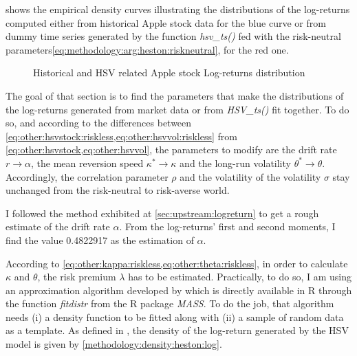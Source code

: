 \documentclass[12pt]{report}
\begin{document}
 shows the empirical density curves illustrating the distributions of the log-returns computed either from historical Apple stock data for the blue curve or from dummy time series generated by the function \textit{hsv\_ts()} fed with the risk-neutral parameters\ref{eq:methodology:arg:heston:riskneutral}, for the red one.


\begin{figure}[ht]
  \centering
  
  \caption{Historical and HSV related Apple stock Log-returns distribution}
  \label{p:methodology:density:aapl:heston:riskneutral}
\end{figure}


The goal of that section is to find the parameters that make the distributions of the log-returns generated from market data or from \textit{HSV\_ts()} fit together.
To do so, and according to the differences between \cref{eq:other:hsvstock:riskless,eq:other:hsvvol:riskless} from \cref{eq:other:hsvstock,eq:other:hsvvol}, the parameters to modify are the drift rate $r \to \alpha$, the mean reversion speed $\kappa^{*} \to \kappa$ and the long-run volatility $\theta^* \to \theta$.
Accordingly, the correlation parameter $\rho$ and the volatility of the volatility $\sigma$ stay unchanged from  the risk-neutral to risk-averse world.

I followed the method exhibited at \cref{sec:upstream:logreturn} to get a rough estimate of the drift rate $\alpha$. From the log-returns' first and second moments, I find the value 0.4822917 as the estimation of $\alpha$.

According to \cref{eq:other:kappa:riskless,eq:other:theta:riskless}, in order to  calculate $\kappa$ and $\theta$, the risk premium $\lambda$ has to be estimated.
Practically, to do so, I am using an approximation algorithm developed by \cite{MASS} which is directly available in R through the function \textit{fitdistr} from the R package \textit{MASS}. 
To do the job, that algorithm needs (i) a density function to be fitted along with (ii) a sample of random data as a template.
As defined in \citet{Adrian}, the density of the log-return generated by the HSV model is given by \cref{methodology:density:heston:log}.
\end{document}
